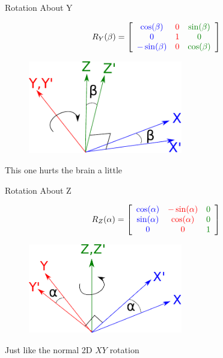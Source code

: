 \documentclass{beamer}
\begin{document}
\begin{frame}{Rotation About Y}

\[ R_Y(\beta) = \left[ \begin{array}{ccc} \textcolor{blue}{\cos(\beta)} & \textcolor{red}{0} & \textcolor{darkgreen}{\sin(\beta)} \\ \textcolor{blue}{0} & \textcolor{red}{1} & \textcolor{darkgreen}{0}  \\ \textcolor{blue}{-\sin(\beta)} & \textcolor{red}{0} & \textcolor{darkgreen}{\cos(\beta)} \end{array}\right] \]

\begin{figure}[t]
	\centering
	\includegraphics[width=0.6\textwidth]{3DRotY.pdf}
\end{figure}

This one hurts the brain a little

\end{frame}

\begin{frame}{Rotation About Z}

\[ R_Z(\alpha) = \left[ \begin{array}{ccc} \textcolor{blue}{\cos(\alpha)} & \textcolor{red}{-\sin(\alpha)} & \textcolor{darkgreen}{0} \\ \textcolor{blue}{\sin(\alpha)} & \textcolor{red}{\cos(\alpha)} & \textcolor{darkgreen}{0}  \\ \textcolor{blue}{0} & \textcolor{red}{0} & \textcolor{darkgreen}{1} \end{array}\right] \]

\begin{figure}[t]
	\centering
	\includegraphics[width=0.6\textwidth]{3DRotZ.pdf}
\end{figure}

Just like the normal 2D $XY$ rotation

\end{frame}
\end{document}

